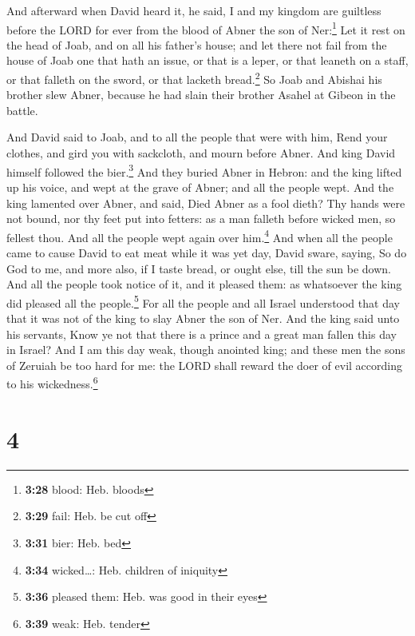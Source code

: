  And afterward when David heard it, he said, I and my
kingdom are guiltless before the LORD for ever from the blood of Abner
the son of Ner:\footnote{\textbf{3:28} blood: Heb. bloods}
 Let it rest on the head of Joab, and on all his father's
house; and let there not fail from the house of Joab one that hath an
issue, or that is a leper, or that leaneth on a staff, or that falleth
on the sword, or that lacketh bread.\footnote{\textbf{3:29} fail: Heb.
  be cut off}  So Joab and Abishai his brother slew
Abner, because he had slain their brother Asahel at Gibeon in the
battle.

 And David said to Joab, and to all the people that were
with him, Rend your clothes, and gird you with sackcloth, and mourn
before Abner. And king David himself followed the bier.\footnote{\textbf{3:31}
  bier: Heb. bed}  And they buried Abner in Hebron: and
the king lifted up his voice, and wept at the grave of Abner; and all
the people wept.  And the king lamented over Abner, and
said, Died Abner as a fool dieth?  Thy hands were not
bound, nor thy feet put into fetters: as a man falleth before wicked
men, so fellest thou. And all the people wept again over him.\footnote{\textbf{3:34}
  wicked\ldots: Heb. children of iniquity}  And when all
the people came to cause David to eat meat while it was yet day, David
sware, saying, So do God to me, and more also, if I taste bread, or
ought else, till the sun be down.  And all the people
took notice of it, and it pleased them: as whatsoever the king did
pleased all the people.\footnote{\textbf{3:36} pleased them: Heb. was
  good in their eyes}  For all the people and all Israel
understood that day that it was not of the king to slay Abner the son of
Ner.  And the king said unto his servants, Know ye not
that there is a prince and a great man fallen this day in Israel?
 And I am this day weak, though anointed king; and these
men the sons of Zeruiah be too hard for me: the LORD shall reward the
doer of evil according to his wickedness.\footnote{\textbf{3:39} weak:
  Heb. tender}

\hypertarget{section-3}{%
\section{4}\label{section-3}}

